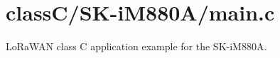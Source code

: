 \hypertarget{classC_2SK-iM880A_2main_8c-example}{}\section{class\+C/\+S\+K-\/i\+M880\+A/main.\+c}
Lo\+Ra\+W\+AN class C application example for the S\+K-\/i\+M880A.


\begin{DoxyCodeInclude}
\end{DoxyCodeInclude}
 